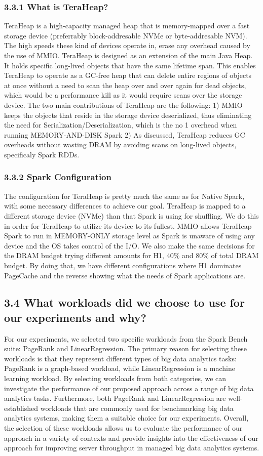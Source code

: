 \documentclass[twocolumn,10pt]{asme2e}
\begin{document}
\subsubsection*{3.3.1 What is TeraHeap?}
TeraHeap is a high-capacity managed heap that is memory-mapped over a fast storage device (preferrably block-addresable NVMe or byte-addresable NVM). The high speeds these kind of devices operate in, erase any overhead caused by the use of MMIO. TeraHeap is designed as an extension of the main Java Heap. It holds specific long-lived objects that have the same lifetime span. This enables TeraHeap to operate as a GC-free heap that can delete entire regions of objects at once without a need to scan the heap over and over again for dead objects, which would be a performance kill as it would require scans over the storage device. The two main contributions of TeraHeap are the following: 1) MMIO keeps the objects that reside in the storage device deserialized, thus eliminating the need for Serialization/Deserialization, which is the no 1 overhead when running MEMORY-AND-DISK Spark 2) As discussed, TeraHeap reduces GC overheads without wasting DRAM by avoiding scans on long-lived objects, specificaly Spark RDDs.
\subsubsection*{3.3.2 Spark Configuration}
The configuration for TeraHeap is pretty much the same as for Native Spark, with some necessary differences to achieve our goal. TeraHeap is mapped to a different storage device (NVMe) than that Spark is using for shuffling. We do this in order for TeraHeap to utilize its device to its fullest. MMIO allows TeraHeap Spark to run in MEMORY-ONLY storage level as Spark is unaware of using any device and the OS takes control of the I/O. We also make the same decisions for the DRAM budget trying different amounts for H1, 40\% and 80\% of total DRAM budget. By doing that, we have different configurations where H1 dominates PageCache and the reverse showing what the needs of Spark applications are. 

\subsection*{3.4 What workloads did we choose to use for our experiments and why?}
For our experiments, we selected two specific workloads from the Spark Bench suite: PageRank and LinearRegression. The primary reason for selecting these workloads is that they represent different types of big data analytics tasks: PageRank is a graph-based workload, while LinearRegression is a machine learning workload. By selecting workloads from both categories, we can investigate the performance of our proposed approach across a range of big data analytics tasks. Furthermore, both PageRank and LinearRegression are well-established workloads that are commonly used for benchmarking big data analytics systems, making them a suitable choice for our experiments. Overall, the selection of these workloads allows us to evaluate the performance of our approach in a variety of contexts and provide insights into the effectiveness of our approach for improving server throughput in managed big data analytics systems.
\end{document}
